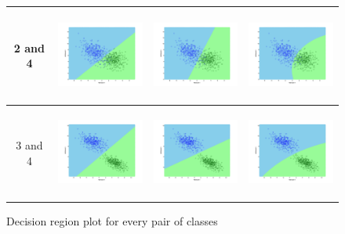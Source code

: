 \documentclass[a4paper]{article}
\begin{document}
\begin{figure}
\begin{tabular}{|c|c|c|c|}
				\hline
				2 and
				4&\includegraphics[width=40mm,height=30mm]{naivebayes/over/pair/24/all_cov.png}&\includegraphics[width=40mm,height=30mm]{naivebayes/over/pair/24/avg_cov.png}
				&\includegraphics[width=40mm,height=30mm]{naivebayes/over/pair/24/diff_cov.png}\\
				\hline
				3 and
				4&\includegraphics[width=40mm,height=30mm]{naivebayes/over/pair/34/all_cov.png}&\includegraphics[width=40mm,height=30mm]{naivebayes/over/pair/34/avg_cov.png}
				&\includegraphics[width=40mm,height=30mm]{naivebayes/over/pair/34/diff_cov.png}\\
				\hline
				
			\end{tabular}
			\caption{Decision region plot for every pair of classes}
			\end{figure}
		
\end{document}

